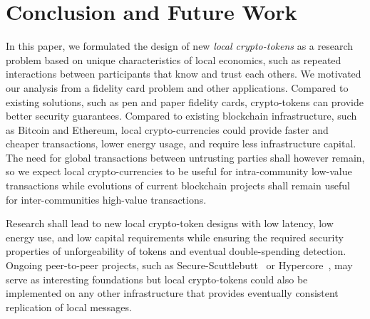 \documentclass[sigplan,screen,10pt]{acmart}
\newcommand\ssbtokens[0]{\textit{SSB-Tokens} }
\begin{document}

\section{Conclusion and Future Work}
\label{section:conclusion}

In this paper, we formulated the design of new \textit{local crypto-tokens} as a research problem based on unique characteristics of local economics, such as repeated interactions between participants that know and trust each others. We motivated our analysis from a fidelity card problem and other applications. Compared to existing solutions, such as pen and paper fidelity cards, crypto-tokens can provide better security guarantees. Compared to existing blockchain infrastructure, such as Bitcoin and Ethereum, local crypto-currencies could provide faster and cheaper transactions, lower energy usage, and require less infrastructure capital. The need for global transactions between untrusting parties shall however remain, so we expect local crypto-currencies to be useful for intra-community low-value transactions while evolutions of current blockchain projects shall remain useful for inter-communities high-value transactions.

Research shall lead to new local crypto-token designs with low latency, low energy use, and low capital requirements while ensuring the required security properties of unforgeability of tokens and eventual double-spending detection. Ongoing peer-to-peer projects, such as Secure-Scuttlebutt~\cite{tarr2019ssb} or Hypercore~\cite{hypercore}, may serve as interesting foundations but local crypto-tokens could also be implemented on any other infrastructure that provides eventually consistent replication of local messages.



\end{document}

